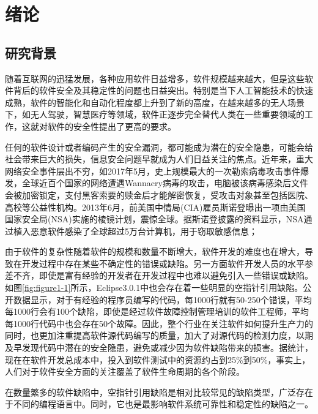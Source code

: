 \chapter{绪论}
\label{chap:intro}
\section{研究背景}

随着互联网的迅猛发展，各种应用软件日益增多，软件规模越来越大，但是这些软件背后的软件安全及其稳定性的问题也日益突出。特别是当下人工智能技术的快速成熟，软件的智能化和自动化程度都上升到了新的高度，在越来越多的无人场景下，如无人驾驶，智慧医疗等领域，软件正逐步完全替代人类在一些重要领域的工作，这就对软件的安全性\cite{chess2011software}提出了更高的要求。

任何的软件设计或者编码产生的安全漏洞\cite{shan2002}，都可能成为潜在的安全隐患，可能会给社会带来巨大的损失，信息安全问题早就成为人们日益关注的焦点\cite{vassilev2014importance}。近年来，重大网络安全事件层出不穷，如2017年5月，史上规模最大的一次勒索病毒攻击事件爆发，全球近百个国家的网络遭遇Wannacry病毒\cite{li2017wannacry}的攻击，电脑被该病毒感染后文件会被加密锁定，支付黑客索要的赎金后才能解密恢复，受攻击对象甚至包括医院、高校等公益性机构。2013年6月，前美国中情局(CIA)雇员斯诺登曝出一项由美国国家安全局(NSA)实施的棱镜计划\cite{zhang2014}，震惊全球。据斯诺登披露的资料显示，NSA通过植入恶意软件感染了全球超过5万台计算机，用于窃取敏感信息；

由于软件的复杂性随着软件的规模和数量不断增大，软件开发的难度也在增大，导致在开发过程中存在某些不确定性的错误或缺陷。另一方面软件开发人员的水平参差不齐，即使是富有经验的开发者在开发过程中也难以避免引入一些错误或缺陷。如图\ref{fig:figure1-1}所示，Eclipse3.0.1中也会存在着一些明显的空指针引用缺陷\cite{hovemeyer2005evaluating}。公开数据显示，对于有经验的程序员编写的代码，每1000行就有50-250个错误，平均每1000行会有100个缺陷，即使是经过软件故障控制管理培训的软件工程师，平均每1000行代码中也会存在50个故障\cite{gong2008}。因此，整个行业在关注软件如何提升生产力的同时，也更加注重提高软件源代码编写的质量，加大了对源代码的检测力度，以期及早发现代码中潜在的安全隐患，避免或减少因为软件缺陷带来的损害。据统计，现在在软件开发总成本中，投入到软件测试中的资源约占到25\%到50\%\cite{gong2006}，事实上，人们对于软件安全方面的关注覆盖了软件生命周期的各个阶段。

在数量繁多的软件缺陷中，空指针引用缺陷是相对比较常见的缺陷类型，广泛存在于不同的编程语言中。同时，它也是最影响软件系统可靠性和稳定性的缺陷之一。

